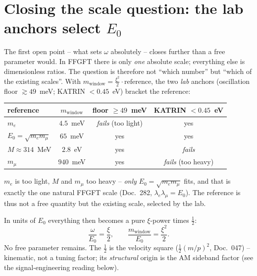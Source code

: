 \section{Closing the scale question: the lab anchors select $E_0$}
The first open point -- what sets $\omega$ absolutely -- closes further than a free parameter would. In
FFGFT there is only \emph{one} absolute scale; everything else is dimensionless ratios. The question is
therefore not \enquote{which number} but \enquote{which of the existing scales}. With
$m_{\text{window}}=\tfrac{\xi^2}{2}\cdot\text{reference}$, the two \emph{lab} anchors (oscillation floor
$\gtrsim49$~meV; KATRIN $<0.45$~eV) bracket the reference:
\begin{center}
\begin{tabular}{lccc}
\toprule
reference & $m_{\text{window}}$ & floor $\ge49$~meV & KATRIN $<0.45$~eV \\
\midrule
$m_e$ & $4.5$~meV & \emph{fails} (too light) & yes \\
$E_0=\sqrt{m_e m_\mu}$ & $65$~meV & yes & yes \\
$M\approx314$~MeV & $2.8$~eV & yes & \emph{fails} \\
$m_\mu$ & $940$~meV & yes & \emph{fails} (too heavy) \\
\bottomrule
\end{tabular}
\end{center}
$m_e$ is too light, $M$ and $m_\mu$ too heavy -- \emph{only} $E_0=\sqrt{m_e m_\mu}$ fits, and that is
exactly the one natural FFGFT scale (Doc.~282, $\lambda_e\lambda_\mu=E_0$). The reference is thus not a
free quantity but the existing scale, selected by the lab.

In units of $E_0$ everything then becomes a pure $\xi$-power times $\tfrac12$:
\begin{equation}
\frac{\omega}{E_0}=\frac{\xi}{2},\qquad \frac{m_{\text{window}}}{E_0}=\frac{\xi^2}{2}.
\end{equation}
No free parameter remains. The $\tfrac12$ is the velocity square ($\tfrac12(m/p)^2$, Doc.~047) --
kinematic, not a tuning factor; its \emph{structural} origin is the AM sideband factor (see the
signal-engineering reading below).

